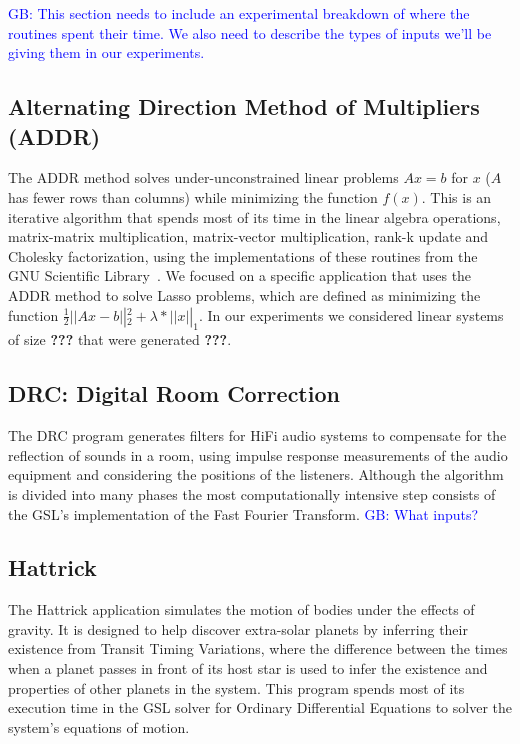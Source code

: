 \documentclass{sig-alternate}
\newcommand{\greg}[1]{%
  \textcolor{blue}{GB: #1}
}
\begin{document}
\greg{This section needs to include an experimental breakdown of where the routines spent their time. We also need to describe the types of inputs we'll be giving them in our experiments.}

\subsection{Alternating Direction Method of Multipliers (ADDR)}
\label{sec:apps:lasso}
The ADDR method solves under-unconstrained linear problems $Ax=b$ for $x$ ($A$ has fewer rows than columns) while minimizing the function $f(x)$.
This is an iterative algorithm that spends most of its time in the linear algebra operations, matrix-matrix multiplication, matrix-vector multiplication, rank-k update and Cholesky factorization, using the implementations of these routines from the GNU Scientific Library~\cite{gsl:2011}.
We focused on a specific application that uses the ADDR method to solve Lasso problems, which are defined as minimizing the function $\frac{1}{2} \left|| Ax - b \right||_2^2 + \lambda*\left|| x \right||_1$.
In our experiments we considered linear systems of size \textbf{???} that were generated \textbf{???}.

\subsection{DRC: Digital Room Correction}
\label{sec:apps:drc}

The DRC program generates filters for HiFi audio systems to compensate for the reflection of sounds in a room, using impulse response measurements of the audio equipment and considering the positions of the listeners.
Although the algorithm is divided into many phases the most computationally intensive step consists of the GSL's implementation of the Fast Fourier Transform.
\greg{What inputs?}

\subsection{Hattrick}
\label{sec:apps:hattrick}
The Hattrick application simulates the motion of bodies under the effects of gravity.
It is designed to help discover extra-solar planets by inferring their existence from Transit Timing Variations, where the difference between the times when a planet passes in front of its host star is used to infer the existence and properties of other planets in the system.
This program spends most of its execution time in the GSL solver for Ordinary Differential Equations to solver the system's equations of motion.
\end{document}
